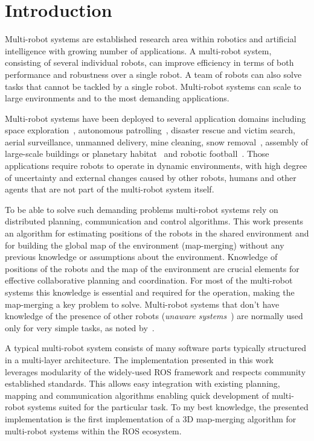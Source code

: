 \chapter*{Introduction}

Multi-robot systems are established research area within robotics and artificial intelligence with growing number of applications. A multi-robot system, consisting of several individual robots, can improve efficiency in terms of both performance and robustness over a single robot. A team of robots can also solve tasks that cannot be tackled by a single robot. Multi-robot systems can scale to large environments and to the most demanding applications.

Multi-robot systems have been deployed to several application domains including space exploration~\citep{goldberg2002distributedspace,huntsberger2003campout}, autonomous patrolling~\citep{parker2003parolling100}, disaster rescue and victim search, aerial surveillance, unmanned delivery, mine cleaning, snow removal~\citep{choset2001coverage}, assembly of large-scale buildings or planetary habitat~\citep{goldberg2002distributedspace} and robotic football~\citep{asada1999robocup}. Those applications require robots to operate in  dynamic environments, with high degree of uncertainty and external changes caused by other robots, humans and other agents that are not part of the multi-robot system itself.

To be able to solve such demanding problems multi-robot systems rely on distributed planning, communication and control algorithms. This work presents an algorithm for estimating positions of the robots in the shared environment and for building the global map of the environment (map-merging) without any previous knowledge or assumptions about the environment. Knowledge of positions of the robots and the map of the environment are crucial elements for effective collaborative planning and coordination. For most of the multi-robot systems this knowledge is essential and required for the operation, making the map-merging a key problem to solve. Multi-robot systems that don't have knowledge of the presence of other robots (\textit{unaware systems}~\citep{farinelli2004multirobot}) are normally used only for very simple tasks, as noted by~\citet{farinelli2004multirobot}.

A typical multi-robot system consists of many software parts typically structured in a multi-layer architecture. The implementation presented in this work leverages modularity of the widely-used \gls{ROS} framework and respects community established standards. This allows easy integration with existing planning, mapping and communication algorithms enabling quick development of multi-robot systems suited for the particular task. To my best knowledge, the presented implementation is the first implementation of a \gls{3D} map-merging algorithm for multi-robot systems within the \gls{ROS} ecosystem.

